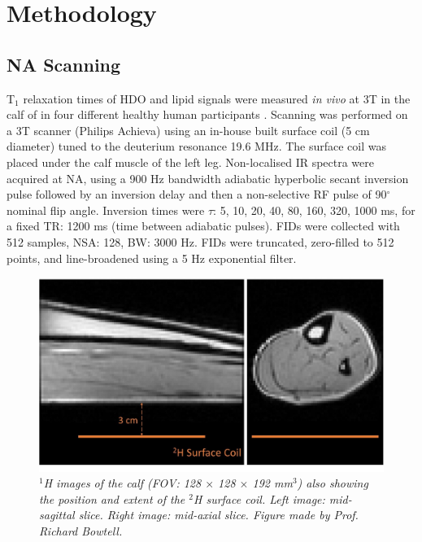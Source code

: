 \section{Methodology}

\subsection{\texorpdfstring{\ac{NA}}{NA} Scanning}

T$_1$ relaxation times of \ac{HDO} and lipid signals were measured \textit{in vivo} at 3T in the calf of in four different healthy human participants \cite{Damion2021NaturalT}. Scanning was performed on a 3T scanner (Philips Achieva) using an in-house built surface coil (5 cm diameter) tuned to the deuterium resonance 19.6 MHz. The surface coil was placed under the calf muscle of the left leg. Non-localised \ac{IR} spectra were acquired at \ac{NA}, using a 900 Hz bandwidth adiabatic hyperbolic secant inversion pulse followed by an inversion delay and then a non-selective \ac{RF} pulse of 90$^\circ$ nominal flip angle. Inversion times were $\tau$: {5, 10, 20, 40, 80, 160, 320, 1000} ms, for a fixed \ac{TR}: 1200 ms (time between adiabatic pulses). \ac{FID}s were collected with 512 samples, NSA: 128, \ac{BW}: 3000 Hz. FIDs were truncated, zero-filled to 512 points, and line-broadened using a 5 Hz exponential filter. %

\begin{figure}
    \centering
    \includegraphics[width=1\textwidth]{Figures/Lipid/Coil.jpg}
    \caption{\textit{$^1$H images of the calf (\ac{FOV}: 128 $\times$ 128 $\times$ 192 mm$^3$) also showing the position and extent of the $^2$H surface coil. Left image: mid-sagittal slice. Right image: mid-axial slice. Figure made by Prof. Richard Bowtell.}}
    \label{fig:Lip:Coil}
\end{figure}

